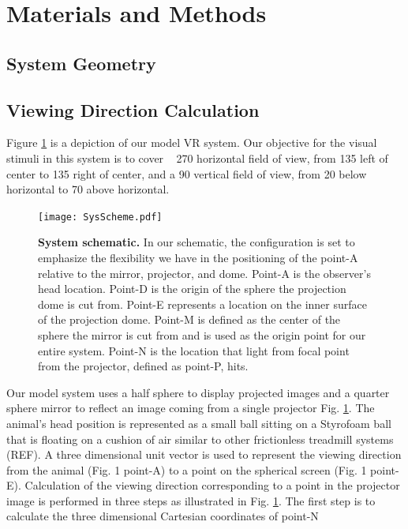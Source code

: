 \documentclass[10pt,letterpaper]{article}
\begin{document}
\section*{Materials and Methods}


\subsection*{System Geometry}

\subsection*{Viewing Direction Calculation}

Figure \ref{fig:SysScheme} is a depiction of our model VR system. Our objective 
for the visual stimuli in this system is to cover ~ 270\textdegree{} horizontal field of view, from 135\textdegree{} left of center to 135\textdegree{} 
right of center, and a 90\textdegree{} vertical field of view, from 20\textdegree{} below horizontal to 70\textdegree{} above horizontal. 
\begin{figure}[h]
\centering
\texttt{[image: SysScheme.pdf]}
\caption{{\bf System schematic.}
In our schematic, the configuration is set to emphasize the flexibility we have in the positioning of the point-A relative to the mirror, projector, and dome. Point-A is the observer's head location. Point-D is the origin of the sphere the projection dome is cut from. Point-E represents a location on the inner surface of the projection dome. Point-M is defined as the center of the sphere the mirror is cut from and is used as the origin point for our entire system. Point-N is the location that light from focal point from the projector, defined as point-P, hits.}
\label{fig:SysScheme}
\end{figure}
Our model system uses a half sphere to display projected images and a quarter sphere mirror to reflect an image coming from a single 
projector Fig. \ref{fig:SysScheme}. The animal’s head position is represented as a small ball sitting on a Styrofoam ball that is floating on a cushion of air 
similar to other frictionless treadmill systems (REF). A three dimensional unit vector is used to represent the viewing direction from the animal 
(Fig. 1 point-A) to a point on the spherical screen (Fig. 1 point-E). Calculation of the viewing direction corresponding to a point in the projector image 
is performed in three steps as illustrated in Fig. \ref{fig:SysScheme}. The first step is to calculate the three dimensional Cartesian coordinates of point-N 
\end{document}
